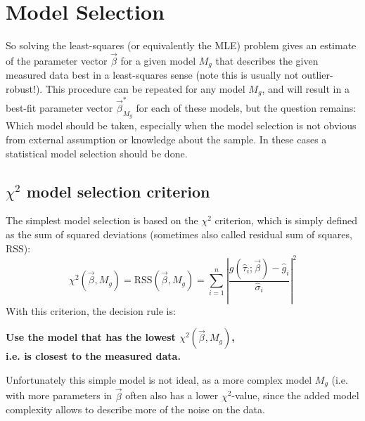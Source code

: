 \documentclass[a4paper,notitlepage]{article}
\begin{document}
\section{Model Selection}
So solving the least-squares (or equivalently the MLE) problem gives an estimate of the parameter vector $\vec{\beta}$ for a given model $M_g$ that describes the given measured data best in a least-squares sense (note this is usually not outlier-robust!). This procedure can be repeated for any model $M_g$, and will result in a best-fit parameter vector $\vec{\beta}_{M_g}^\ast$ for each of these models, but the question remains: Which model should be taken, especially when the model selection is not obvious from external assumption or knowledge about the sample. In these cases a statistical model selection should be done. 

\subsection{$\chi^2$ model selection criterion}
The simplest model selection is based on the $\chi^2$ criterion, which is simply defined as the sum of squared deviations (sometimes also called residual sum of squares, RSS):
\begin{equation}\label{eq:chi2_rss}
  \chi^2(\vec{\beta},M_g)=\mbox{RSS}(\vec{\beta},M_g)=\sum\limits_{i=1}^n\left|\frac{g(\hat{\tau}_i;\vec{\beta})-\hat{g}_i}{\hat{\sigma}_i}\right|^2
\end{equation}
With this criterion, the decision rule is:
\begin{center}
  \bfseries Use the model that has the lowest $\chi^2(\vec{\beta},M_g)$, \\i.e. is closest to the measured data.
\end{center}
Unfortunately this simple model is not ideal, as a more complex model $M_g$ (i.e. with more parameters in $\vec{\beta}$ often also has a lower $\chi^2$-value, since the added model complexity allows to describe more of the noise on the data.
\end{document}
